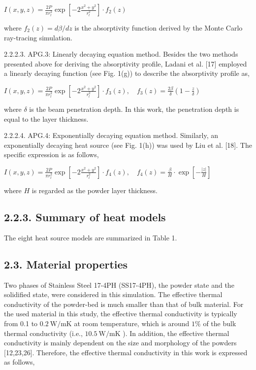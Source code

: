 \documentclass[10pt]{article}
\begin{document}
$I(x, y, z)=\frac{2 P}{\pi r_{l}^{2}} \exp \left[-2 \frac{x^{2}+y^{2}}{r_{l}^{2}}\right] \cdot f_{2}(z)$

where $f_{2}(z)=d \beta / d z$ is the absorptivity function derived by the Monte Carlo ray-tracing simulation.

2.2.2.3. APG.3: Linearly decaying equation method. Besides the two methods presented above for deriving the absorptivity profile, Ladani et al. [17] employed a linearly decaying function (see Fig. 1(g)) to describe the absorptivity profile as,

$I(x, y, z)=\frac{2 P}{\pi r_{l}^{2}} \exp \left[-2 \frac{x^{2}+y^{2}}{r_{l}^{2}}\right] \cdot f_{3}(z), \quad f_{3}(z)=\frac{2 \beta}{\delta}\left(1-\frac{z}{\delta}\right)$

where $\delta$ is the beam penetration depth. In this work, the penetration depth is equal to the layer thickness.

2.2.2.4. APG.4: Exponentially decaying equation method. Similarly, an exponentially decaying heat source (see Fig. 1(h)) was used by Liu et al. [18]. The specific expression is as follows,

$I(x, y, z)=\frac{2 P}{\pi r_{l}^{2}} \exp \left[-2 \frac{x^{2}+y^{2}}{r_{l}^{2}}\right] \cdot f_{4}(z), \quad f_{4}(z)=\frac{\beta}{H} \cdot \exp \left[-\frac{|z|}{H}\right]$

where $H$ is regarded as the powder layer thickness.

\subsection*{2.2.3. Summary of heat models}
The eight heat source models are summarized in Table 1.

\subsection*{2.3. Material properties}
Two phases of Stainless Steel 17-4PH (SS17-4PH), the powder state and the solidified state, were considered in this simulation. The effective thermal conductivity of the powder-bed is much smaller than that of bulk material. For the used material in this study, the effective thermal conductivity is typically from 0.1 to $0.2 \mathrm{~W} / \mathrm{mK}$ at room temperature, which is around $1 \%$ of the bulk thermal conductivity (i.e., $10.5 \mathrm{~W} / \mathrm{mK}$ ). In addition, the effective thermal conductivity is mainly dependent on the size and morphology of the powders [12,23,26]. Therefore, the effective thermal conductivity in this work is expressed as follows,
\end{document}
